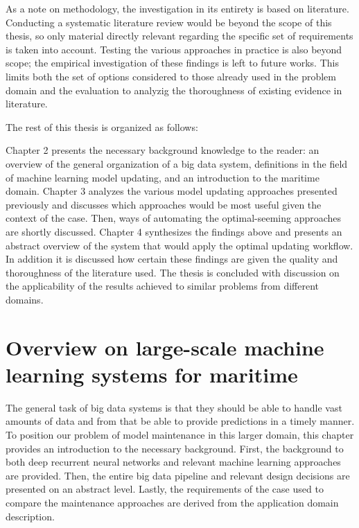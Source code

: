 
As a note on methodology, the investigation in its entirety is based on literature. Conducting a systematic literature review would be beyond the scope of this thesis, so only material directly relevant regarding the specific set of requirements is taken into account. Testing the various approaches in practice is also beyond scope; the empirical investigation of these findings is left to future works. This limits both the set of options considered to those already used in the problem domain and the evaluation to analyzig the thoroughness of existing evidence in literature.


The rest of this thesis is organized as follows:

Chapter 2 presents the necessary background knowledge to the reader: an overview of the general organization of a big data system, definitions in the field of machine learning model updating, and an introduction to the maritime domain. Chapter 3 analyzes the various model updating approaches presented previously and discusses which approaches would be most useful given the context of the case. Then, ways of automating the optimal-seeming approaches are shortly discussed. Chapter 4 synthesizes the findings above and presents an abstract overview of the system that would apply the optimal updating workflow. In addition it is discussed how certain these findings are given the quality and thoroughness of the literature used. The thesis is concluded with discussion on the applicability of the results achieved to similar problems from different domains.

\chapter[Overview on large-scale machine learning systems for maritime]{Overview on large-scale machine\\ learning systems for maritime}


The general task of big data systems is that they should be able to handle vast amounts of data and from that be able to provide predictions in a timely manner. To position our problem of model maintenance in this larger domain, this chapter provides an introduction to the necessary background. First, the background to both deep recurrent neural networks and relevant machine learning approaches are provided. Then, the entire big data pipeline and relevant design decisions are presented on an abstract level. Lastly, the requirements of the case used to compare the maintenance approaches are derived from the application domain description.

